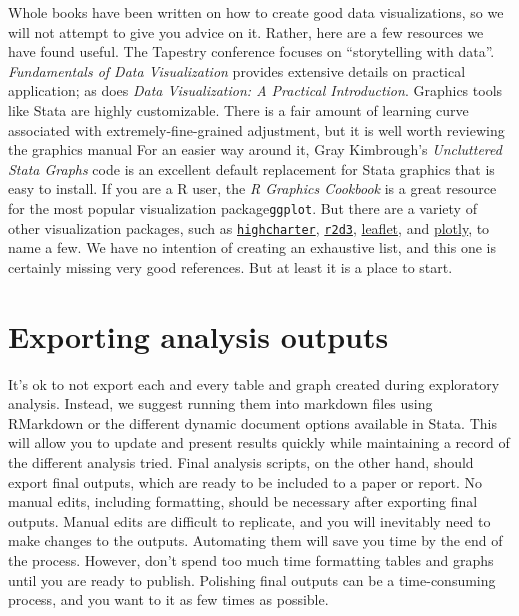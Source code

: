 Whole books have been written on how to create good data visualizations,
so we will not attempt to give you advice on it.
Rather, here are a few resources we have found useful.
The Tapestry conference focuses on ``storytelling with data''.
\textit{Fundamentals of Data Visualization} provides extensive details on practical application;
as does \textit{Data Visualization: A Practical Introduction}.
Graphics tools like Stata are highly customizable.
There is a fair amount of learning curve associated with extremely-fine-grained adjustment,
but it is well worth reviewing the graphics manual
For an easier way around it, Gray Kimbrough's \textit{Uncluttered Stata Graphs} code is an excellent default replacement for Stata graphics that is easy to install.
If you are a R user, the \textit{R Graphics Cookbook} is a great resource for the most popular visualization package\texttt{ggplot}. But there are a variety of other visualization packages, such as \href{http://jkunst.com/highcharter/}{\texttt{highcharter}}, \href{https://rstudio.github.io/r2d3/}{\texttt{r2d3}}, \href{https://rstudio.github.io/leaflet/}{leaflet}, and \href{https://plot.ly/r/}{plotly}, to name a few.
We have no intention of creating an exhaustive list, and this one is certainly missing very good references.
But at least it is a place to start.

\section{Exporting analysis outputs}
It's ok to not export each and every table and graph created during exploratory analysis. 
Instead, we suggest running them into markdown files using RMarkdown or the different dynamic document options available in Stata. 
This will allow you to update and present results quickly while maintaining a record of the different analysis tried. 
Final analysis scripts, on the other hand, should export final outputs, which are ready to be included to a paper or report.
No manual edits, including formatting, should be necessary after exporting final outputs. 
Manual edits are difficult to replicate, and you will inevitably need to make changes to the outputs. 
Automating them will save you time by the end of the process. 
However, don't spend too much time formatting tables and graphs until you are ready to publish. 
Polishing final outputs can be a time-consuming process, 
and you want to it as few times as possible.

